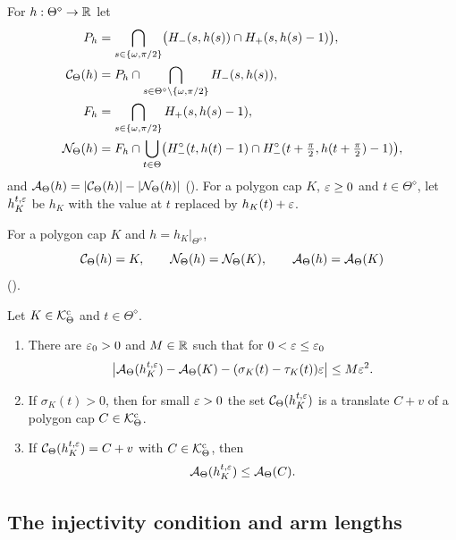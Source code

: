 \begin{definition}\label{def:supportvalues}
For $h:\Theta^\diamond\to\mathbb{R}$ let
\begin{align*}
  P_h&=\bigcap_{s\in\{\omega,\pi/2\}}\bigl(H_-(s,h(s))\cap H_+(s,h(s)-1)\bigr),
    \\
  \mathcal{C}_\Theta(h)&=P_h
    \cap\bigcap_{s\in\Theta^\diamond\setminus\{\omega,\pi/2\}}H_-(s,h(s)),\\
  F_h&=\bigcap_{s\in\{\omega,\pi/2\}}H_+(s,h(s)-1),\\
  \mathcal{N}_\Theta(h)&=F_h\cap\bigcup_{t\in\Theta}\bigl(H^\circ_-(t,h(t)-1)
    \cap H^\circ_-(t+\tfrac\pi2,h(t+\tfrac\pi2)-1)\bigr),
\end{align*}
and $\mathcal{A}_\Theta(h)=\lvert \mathcal{C}_\Theta(h)\rvert-\lvert \mathcal{N}_\Theta(h)\rvert$ ().
For a polygon cap $K$, $\varepsilon\ge0$ and $t\in\Theta^\diamond$, let
$h^{t,\varepsilon}_K$ be $h_K$ with the value at $t$ replaced by $h_K(t)+\varepsilon$.
\end{definition}

For a polygon cap $K$ and $h=h_K|_{\Theta^\diamond}$,
\[
  \mathcal{C}_\Theta(h)=K,\qquad \mathcal{N}_\Theta(h)=\mathcal{N}_\Theta(K),\qquad
  \mathcal{A}_\Theta(h)=\mathcal{A}_\Theta(K)
\]
().

\begin{fact}\label{fact:push}
Let $K\in\mathcal{K}^{\mathrm{c}}_\Theta$ and $t\in\Theta^\diamond$.
\begin{enumerate}[label=(\alph*)]
\item\label{fact:push:derivative} There are $\varepsilon_0>0$ and $M\in\mathbb{R}$ such that
for $0<\varepsilon\le\varepsilon_0$
\[
  \bigl\lvert\mathcal{A}_\Theta(h^{t,\varepsilon}_K)-\mathcal{A}_\Theta(K)-(\sigma_K(t)
    -\tau_K(t))\varepsilon\bigr\rvert\le M\varepsilon^2 .
\]
\item\label{fact:push:translate} If $\sigma_K(t)>0$, then for small $\varepsilon>0$ the
set $\mathcal{C}_\Theta(h^{t,\varepsilon}_K)$ is a translate $C+v$ of a polygon cap
$C\in\mathcal{K}^{\mathrm{c}}_\Theta$. 
\item\label{fact:push:area} If $\mathcal{C}_\Theta(h^{t,\varepsilon}_K)=C+v$ with
$C\in\mathcal{K}^{\mathrm{c}}_\Theta$, then
\[
  \mathcal{A}_\Theta(h^{t,\varepsilon}_K)\le\mathcal{A}_\Theta(C).
\]
\end{enumerate}
\end{fact}

\subsection{The injectivity condition and arm lengths}\label{sec:arms}

